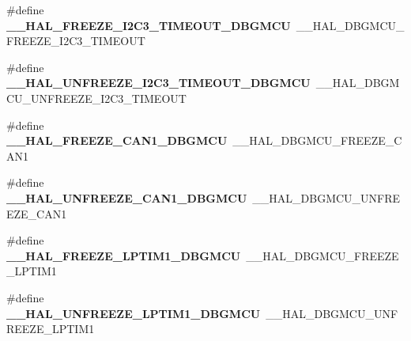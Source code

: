 \begin{DoxyCompactItemize}
\item 
\hypertarget{group___h_a_l___d_b_g_m_c_u___aliased___macros_ga76b6e1661062fd15b339f73e4bf06425}{\#define {\bfseries \-\_\-\-\_\-\-H\-A\-L\-\_\-\-F\-R\-E\-E\-Z\-E\-\_\-\-I2\-C3\-\_\-\-T\-I\-M\-E\-O\-U\-T\-\_\-\-D\-B\-G\-M\-C\-U}~\-\_\-\-\_\-\-H\-A\-L\-\_\-\-D\-B\-G\-M\-C\-U\-\_\-\-F\-R\-E\-E\-Z\-E\-\_\-\-I2\-C3\-\_\-\-T\-I\-M\-E\-O\-U\-T}\label{group___h_a_l___d_b_g_m_c_u___aliased___macros_ga76b6e1661062fd15b339f73e4bf06425}

\item 
\hypertarget{group___h_a_l___d_b_g_m_c_u___aliased___macros_gacf563c1860e9d768762ef5fbece8c9ee}{\#define {\bfseries \-\_\-\-\_\-\-H\-A\-L\-\_\-\-U\-N\-F\-R\-E\-E\-Z\-E\-\_\-\-I2\-C3\-\_\-\-T\-I\-M\-E\-O\-U\-T\-\_\-\-D\-B\-G\-M\-C\-U}~\-\_\-\-\_\-\-H\-A\-L\-\_\-\-D\-B\-G\-M\-C\-U\-\_\-\-U\-N\-F\-R\-E\-E\-Z\-E\-\_\-\-I2\-C3\-\_\-\-T\-I\-M\-E\-O\-U\-T}\label{group___h_a_l___d_b_g_m_c_u___aliased___macros_gacf563c1860e9d768762ef5fbece8c9ee}

\item 
\hypertarget{group___h_a_l___d_b_g_m_c_u___aliased___macros_ga1781f9a122328bdfd756224f4ddb3414}{\#define {\bfseries \-\_\-\-\_\-\-H\-A\-L\-\_\-\-F\-R\-E\-E\-Z\-E\-\_\-\-C\-A\-N1\-\_\-\-D\-B\-G\-M\-C\-U}~\-\_\-\-\_\-\-H\-A\-L\-\_\-\-D\-B\-G\-M\-C\-U\-\_\-\-F\-R\-E\-E\-Z\-E\-\_\-\-C\-A\-N1}\label{group___h_a_l___d_b_g_m_c_u___aliased___macros_ga1781f9a122328bdfd756224f4ddb3414}

\item 
\hypertarget{group___h_a_l___d_b_g_m_c_u___aliased___macros_ga2481aaaf4c950e9ecb27fe5616115164}{\#define {\bfseries \-\_\-\-\_\-\-H\-A\-L\-\_\-\-U\-N\-F\-R\-E\-E\-Z\-E\-\_\-\-C\-A\-N1\-\_\-\-D\-B\-G\-M\-C\-U}~\-\_\-\-\_\-\-H\-A\-L\-\_\-\-D\-B\-G\-M\-C\-U\-\_\-\-U\-N\-F\-R\-E\-E\-Z\-E\-\_\-\-C\-A\-N1}\label{group___h_a_l___d_b_g_m_c_u___aliased___macros_ga2481aaaf4c950e9ecb27fe5616115164}

\item 
\hypertarget{group___h_a_l___d_b_g_m_c_u___aliased___macros_ga834e086b504768fe1c93f807e99a6182}{\#define {\bfseries \-\_\-\-\_\-\-H\-A\-L\-\_\-\-F\-R\-E\-E\-Z\-E\-\_\-\-L\-P\-T\-I\-M1\-\_\-\-D\-B\-G\-M\-C\-U}~\-\_\-\-\_\-\-H\-A\-L\-\_\-\-D\-B\-G\-M\-C\-U\-\_\-\-F\-R\-E\-E\-Z\-E\-\_\-\-L\-P\-T\-I\-M1}\label{group___h_a_l___d_b_g_m_c_u___aliased___macros_ga834e086b504768fe1c93f807e99a6182}

\item 
\hypertarget{group___h_a_l___d_b_g_m_c_u___aliased___macros_ga2f9eea260a1f4d006e8b00b05816e7ba}{\#define {\bfseries \-\_\-\-\_\-\-H\-A\-L\-\_\-\-U\-N\-F\-R\-E\-E\-Z\-E\-\_\-\-L\-P\-T\-I\-M1\-\_\-\-D\-B\-G\-M\-C\-U}~\-\_\-\-\_\-\-H\-A\-L\-\_\-\-D\-B\-G\-M\-C\-U\-\_\-\-U\-N\-F\-R\-E\-E\-Z\-E\-\_\-\-L\-P\-T\-I\-M1}\label{group___h_a_l___d_b_g_m_c_u___aliased___macros_ga2f9eea260a1f4d006e8b00b05816e7ba}


\end{DoxyCompactItemize}
